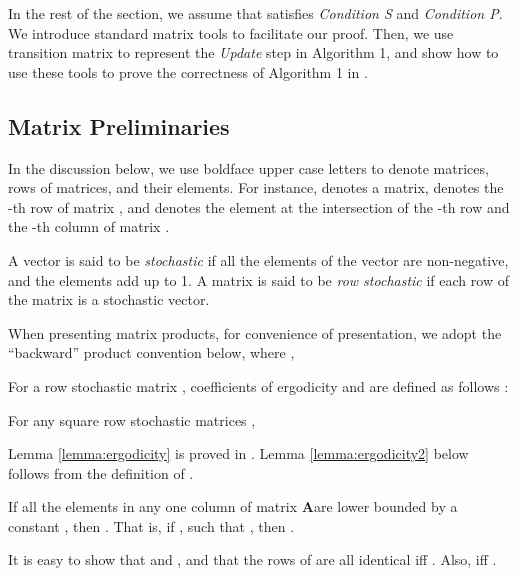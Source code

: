 \documentclass{llncs}
\newcommand{\bfA}{{\bf A}}
\begin{document}
In the rest of the section, we assume that  satisfies {\em Condition S}  and {\em Condition P}. We introduce standard matrix tools to facilitate our proof. Then, we use transition matrix to represent the {\em Update} step in Algorithm 1, and show how to use these tools to prove the correctness of Algorithm 1 in .



\subsection{Matrix Preliminaries}


In the discussion below, we use boldface upper case letters to denote matrices,
rows of matrices, and their elements. For instance,
 denotes a matrix,  denotes the -th row of
matrix , and  denotes the element at the
intersection of the -th row and the -th column
of matrix .

\begin{definition}
\label{d_stochastic}
A vector is said to be {\em stochastic} if all the elements
of the vector are non-negative, and the elements add up to 1.
A matrix is said to be {\em row stochastic} if each row of the matrix is a
stochastic vector. 
\end{definition}

When presenting matrix products, for convenience of presentation, we adopt the ``backward'' product convention below, where ,




For a row stochastic matrix ,
 coefficients of ergodicity  and  are defined as
follows \cite{Wolfowitz}:



\begin{lemma}
\label{lemma:ergodicity}
For any  square row stochastic matrices ,


\end{lemma}

Lemma \ref{lemma:ergodicity} is proved in \cite{Hajnal58}. Lemma \ref{lemma:ergodicity2} below follows from the definition of .

\begin{lemma}
\label{lemma:ergodicity2}
If all the elements in any one column of matrix \bfA are lower bounded by a constant , then . That is, if , such that , then .
\end{lemma}

It is easy to show that   and , and that the rows
of  are all identical iff . Also,  iff .
\end{document}
